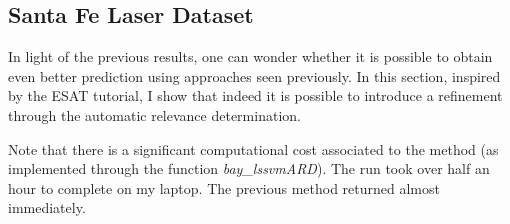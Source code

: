 \documentclass[11pt, a4paper]{article}
\begin{document}
\subsection{Santa Fe Laser Dataset}

In light of the previous results, one can wonder whether it is
possible to obtain even better prediction using approaches seen
previously. In this section, inspired by the ESAT tutorial, I show
that indeed it is possible to introduce a refinement through the
automatic relevance determination.

Note that there is a significant computational cost associated to the
method (as implemented through the function \emph{bay\_lssvmARD}). The
run took over half an hour to complete on my laptop. The previous
method returned almost immediately.

 
\end{document}
